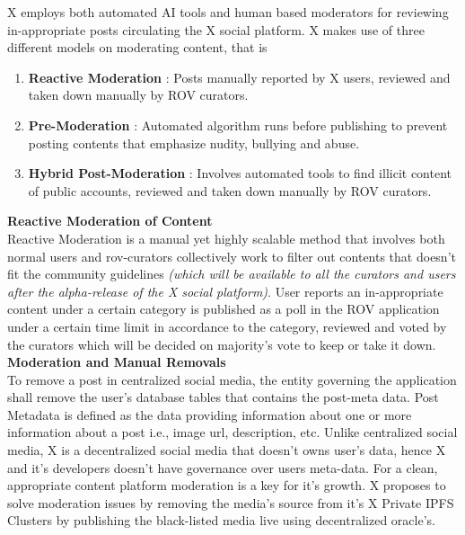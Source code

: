 \documentclass[letterpaper,11pt]{article}
\begin{document}
X employs both automated AI tools and human based moderators for reviewing in-appropriate posts circulating the X social platform. X makes use of three different models on moderating content, that is
\begin{enumerate}[wide, labelwidth=!, labelindent=0pt]
\item \textbf{Reactive Moderation} : Posts manually reported by X users, reviewed and taken down manually by ROV curators.
\item \textbf{Pre-Moderation} : Automated algorithm runs before publishing to prevent posting contents that emphasize nudity, bullying and abuse.
\item \textbf{Hybrid Post-Moderation} : Involves automated tools to find illicit content of public accounts, reviewed and taken down manually by ROV curators.
\end{enumerate}

\textbf{Reactive Moderation of Content}\\

Reactive Moderation is a manual yet highly scalable method that involves both normal users and rov-curators collectively work to filter out contents that doesn't fit the community guidelines \textit{(which will be available to all the curators and users after the alpha-release of the X social platform)}. User reports an in-appropriate content under a certain category is published as a poll in the ROV application under a certain time limit in accordance to the category, reviewed and voted by the curators which will be decided on majority's vote to keep or take it down.\\

\textbf{Moderation and Manual Removals}\\

To remove a post in centralized social media, the entity governing the application shall remove the user's database tables that contains the post-meta data. Post Metadata is defined as the data providing information about one or more information about a post i.e., image url, description, etc. Unlike centralized social media, X is a decentralized social media that doesn't owns user's data, hence X and it's developers doesn't have governance over users meta-data. For a clean, appropriate content platform moderation is a key for it's growth. X proposes to solve moderation issues by removing the media's source from it's X Private IPFS Clusters by publishing the black-listed media live using decentralized oracle's.\\
\end{document}
